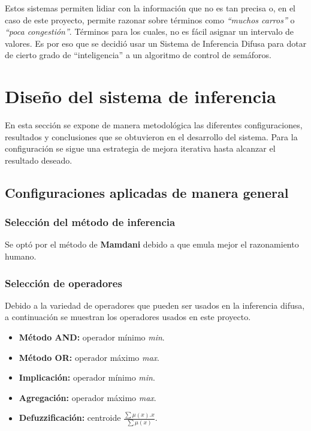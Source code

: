 Estos sistemas permiten lidiar con la información que no es tan precisa o, en el caso de este proyecto, permite razonar sobre términos como \textit{``muchos carros''} o \textit{``poca congestión''}. Términos para los cuales, no es fácil asignar un intervalo de valores. Es por eso que se decidió usar un Sistema de Inferencia Difusa para dotar de cierto grado de ``inteligencia'' a un algoritmo de control de semáforos.
\pagebreak
\section{Diseño del sistema de inferencia}\label{section:desarrolloFIS}
En esta sección se expone de manera metodológica las diferentes configuraciones, resultados y conclusiones que se obtuvieron en el desarrollo del sistema. Para la configuración se sigue una estrategia de mejora iterativa hasta alcanzar el resultado deseado.

\subsection{Configuraciones aplicadas de manera general}
\subsubsection{Selección del método de inferencia}
Se optó por el método de \textbf{Mamdani} debido a que emula mejor el razonamiento humano.

\subsubsection{Selección de operadores}
Debido a la variedad de operadores que pueden ser usados en la inferencia difusa, a continuación se muestran los operadores usados en este proyecto.

\begin{multicols}{2}
\begin{itemize}
	\item \textbf{Método AND:} operador mínimo \emph{min}.
	\item \textbf{Método OR:} operador máximo \emph{max}.
	\item \textbf{Implicación:} operador mínimo \emph{min}.
	\item \textbf{Agregación:} operador máximo \emph{max}.
	\item \textbf{Defuzzificación:} centroide \emph{$\frac{\sum \mu(x).x}{\sum \mu(x)}$}.
\end{itemize}
\end{multicols}

